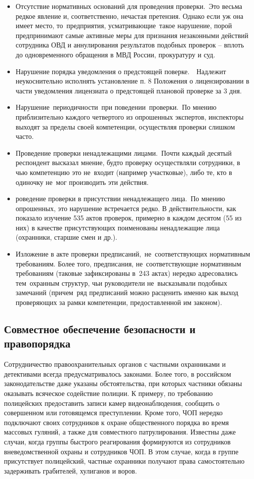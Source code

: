 \documentclass[a4paper,12pt,fleqn]{article} %
\begin{document}
\begin{itemize}
	\item Отсутствие нормативных оснований для проведения проверки. Это весьма редкое явление и, соответственно, нечастая претензия. Однако если уж она имеет место, то предприятия, усматривающие такое нарушение, порой предпринимают самые активные меры для признания незаконными действий сотрудника ОВД и аннулирования результатов подобных проверок – вплоть до одновременного обращения в МВД России, прокуратуру и суд.
	\item Нарушение порядка уведомления о предстоящей поверке.  Надлежит неукоснительно исполнять установление п. 8 Положения о лицензировании в части уведомления лицензиата о предстоящей плановой проверке за 3 дня.
	\item Нарушение периодичности при поведении проверки. По мнению приблизительно каждого четвертого из опрошенных экспертов, инспекторы выходят за пределы своей компетенции, осуществляя проверки слишком часто. 
	\item Проведение проверки ненадлежащими лицами. Поч­ти каждый десятый респондент высказал мнение, будто проверку осуществляли сотрудники, в чью компетенцию это не~входит (например участковые), либо те, кто в одиночку не~мог производить эти действия.
	\item роведение проверки в присутствии ненадлежащего лица. По мнению опрошенных, это нарушение встречается редко. В действительности, как показало изучение 535 актов проверок, примерно в каждом десятом (55 из них) в качестве присутствующих поименованы ненадлежащие лица (охранники, старшие смен и др.).
	\item Изложение в акте проверки предписаний, не~соответствующих нормативным требованиям. Более того, предписания, не~соответствующие нормативным требованиям (таковые зафиксированы в 243 актах) нередко адресовались тем охранным структур, чьи руководители не~высказывали подобных замечаний (причем ряд предписаний можно расценить именно как выход проверяющих за рамки компетенции, предоставленной им законом).
\end{itemize}

\subsection{Совместное обеспечение безопасности и правопорядка}

Сотрудничество правоохранительных органов с частными охранниками и детективами всегда предусматривалось законами. Более того, в российском законодательстве даже указаны обстоятельства, при  которых частники обязаны оказывать всяческое содействие полиции. К примеру, по требованию полицейских предоставить записи камер видеонаблюдения, сообщить о совершенном или готовящемся преступлении. Кроме того, ЧОП нередко подключают своих сотрудников к охране общественного порядка во время массовых гуляний, а также для совместного патрулирования. Известны даже случаи, когда группы быстрого реагирования формируются из сотрудников вневедомственной охраны и сотрудников ЧОП. В этом случае, когда в группе присутствует полицейский, частные охранники получают права самостоятельно задерживать грабителей, хулиганов и воров.
\end{document}
